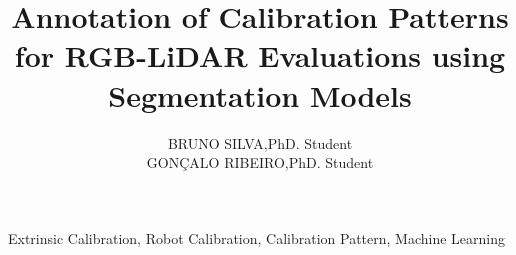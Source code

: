 \documentclass{ieeeaccess}
\begin{document}

\title{Annotation of Calibration Patterns for RGB-LiDAR Evaluations using Segmentation Models}
\author{\uppercase{Bruno Silva},PhD. Student\\
\uppercase{Gonçalo Ribeiro},PhD. Student}

\address[1]{Department of Mechanical Engineering, University of Aveiro}



\begin{abstract}
  \lipsum[1-2]
\end{abstract}

\begin{keywords}
Extrinsic Calibration, Robot Calibration, Calibration Pattern, Machine Learning
\end{keywords}

\titlepgskip=-21pt

\maketitle







\EOD
\end{document}
